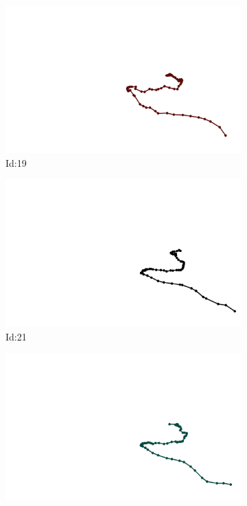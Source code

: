 \documentclass[12pt,twoside]{report}
\begin{document}
\begin{figure}
\centering
\begin{subfigure}[b]{0.20\textwidth}
\centering
\includegraphics[width=\textwidth]{../../trajectories/19.png}
\caption{Id:19}
\end{subfigure}
\begin{subfigure}[b]{0.20\textwidth}
\centering
\includegraphics[width=\textwidth]{../../trajectories/21.png}
\caption{Id:21}
\end{subfigure}
\begin{subfigure}[b]{0.20\textwidth}
\centering
\includegraphics[width=\textwidth]{../../trajectories/192.png}

\end{subfigure}
\end{figure}
\end{document}
